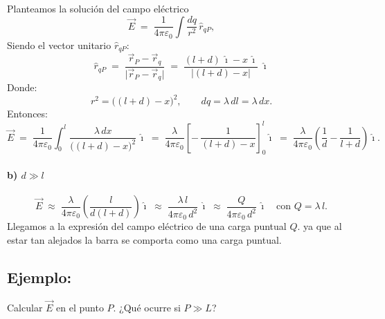 \documentclass[a4paper,12pt]{article}
\begin{document}
\begin{center}
\end{center}
Planteamos la solución del campo eléctrico
\[
\vec E \;=\; \frac{1}{4\pi\varepsilon_0}\int \frac{dq}{r^2}\,\hat r_{qP},
\qquad
\]
Siendo el vector unitario $\hat{r}_{qP}$:
\[
\hat r_{qP} \;=\; \frac{\vec r_P-\vec r_q}{\lvert \vec r_P-\vec r_q\rvert}
\;=\; \frac{(l+d)\,\hat{\imath}-x\,\hat{\imath}}{\lvert (l+d)-x\rvert}
\; \hat{\imath}
\]
Donde:
\[
r^2 = \bigl((l+d)-x\bigr)^2,
\qquad
dq = \lambda\,dl = \lambda\,dx.
\]
Entonces:
\[
\vec E \;=\; \frac{1}{4\pi\varepsilon_0}\int_{0}^{l}
\frac{\lambda\,dx}{\bigl((l+d)-x\bigr)^2}\,\hat{\imath}
\;=\;
\frac{\lambda}{4\pi\varepsilon_0}\left[ -\,\frac{1}{(l+d)-x} \right]_{0}^{l}\hat{\imath}
\;=\;
\frac{\lambda}{4\pi\varepsilon_0}\!\left(\frac{1}{d}-\frac{1}{l+d}\right)\hat{\imath}.
\]

\paragraph*{b) $d\gg l$}
\[
\vec E \;\approx\; \frac{\lambda}{4\pi\varepsilon_0}\left(\frac{l}{d(l+d)}\right)\hat{\imath}
\;\approx\; \frac{\lambda\,l}{4\pi\varepsilon_0\,d^{2}}\,\hat{\imath}
\;\approx\; \frac{Q}{4\pi\varepsilon_0\,d^{2}}\,\hat{\imath}
\quad\text{con } Q=\lambda\,l.
\]
Llegamos a la expresión del campo eléctrico de una carga puntual $Q$. ya que al estar tan alejados la barra se comporta como una carga puntual.

\newpage

\subsection*{Ejemplo:}

Calcular $\vec E$ en el punto $P$.  
¿Qué ocurre si $P \gg L$?
\end{document}
